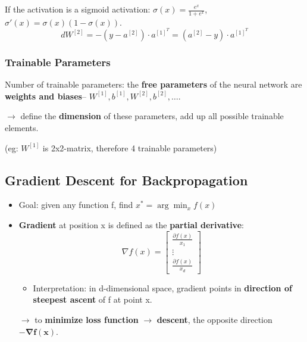 \begin{enumerate}[label= \protect \circled{\arabic*} ]
	If the activation is a sigmoid activation: $\sigma(x) = \frac{e^x}{1 + e^x}$, $\sigma'(x) = \sigma(x)(1 - \sigma(x))$.
	$$dW^{[2]} = -(y- a^{[2]})\cdot a^{[1]^{T}} = (a^{[2]} - y) \cdot a^{[1]^{T}}$$
\end{enumerate}

\subsubsection{Trainable Parameters}
Number of trainable parameters: the \textbf{free parameters} of the neural network are \textbf{weights and biases}-- $W^{[1]}, b^{[1]}, W^{[2]}, b^{[2]}, \dots$. 

$\rightarrow$ define the \textbf{dimension} of these parameters, add up all possible trainable elements. 

(eg: $W^{[1]}$ is 2x2-matrix, therefore 4 trainable parameters)
\subsection{Gradient Descent for Backpropagation}
\begin{itemize}
	\item Goal: given any function f, find $x^* = \arg\min_{x} f(x)$
	\item \textbf{Gradient} at position x is defined as the \textbf{partial derivative}: 
	$$\nabla f(x) = \begin{bmatrix}
	\frac{\partial f(x)}{x_1} \\ \vdots \\ \frac{\partial f(x)}{x_d}
	\end{bmatrix}$$ 
	\begin{itemize}
		\item Interpretation: in d-dimensional space, gradient points in \textbf{direction of steepest ascent} of f at point x. 	
	\end{itemize}
	$\rightarrow$ to \textbf{minimize loss function} $\rightarrow$ \textbf{descent}, the opposite direction $\mathbf{- \nabla f(x)}$.
	
\end{itemize}
